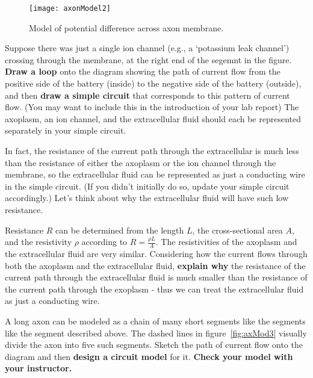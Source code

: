 \begin{wrapfigure}{R}{0.45\textwidth}
  \vspace{-25pt}  
  \begin{center}
    \texttt{[image: axonModel2]}
  \end{center}
  \caption{Model of potential difference across axon membrane.}
  \label{fig:axMod2}
  \vspace{-5pt}
\end{wrapfigure}

\par 
Suppose there was just a single ion channel (e.g., a `potassium leak channel') crossing through the membrane, at the right end of the segemnt in the figure. 
\textbf{Draw a loop} onto the diagram showing the path of current flow from the positive side of the battery (inside) to the negative side of the battery (outside), and then \textbf{draw a simple circuit} that corresponds to this pattern of current flow.
(You may want to include this in the introduction of your lab report)
The axoplasm, an ion channel, and the extracellular fluid should each be represented separately in your simple circuit.
\par 
In fact, the resistance of the current path through the extracellular is much less than the resistance of either the axoplasm or the ion channel through the membrane, so the extracellular fluid can be represented as just a conducting wire in the simple circuit.
(If you didn't initially do so, update your simple circuit accordingly.) 
Let's think about why the extracellular fluid will have such low resistance.
\par 
Resistance $R$ can be determined from the length $L$, the cross-sectional area $A$, and the resistivity $\rho$ according to $R = \frac{\rho L}{A}$.
The resistivities of the axoplasm and the extracellular fluid are very similar.
Considering how the current flows through both the axoplasm and the extracellular fluid, \textbf{explain why} the resistance of the current path through the extracellular fluid is much smaller than the resistance of the current path through the exoplasm - thus we can treat the extracellular fluid as just a conducting wire.
\par 
A long axon can be modeled as a chain of many short segments like the segments like the segment described above.
The dashed lines in figure~\ref{fig:axMod3} visually divide the axon into five such segments.
Sketch the path of current flow onto the diagram and then \textbf{design a circuit model} for it.
\textbf{Check your model with your instructor.}
\par 


